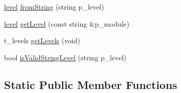 \begin{DoxyCompactItemize}
\item 
\hyperlink{classxtd_1_1logger_a250ce2f143da181d7149a1556da2a6f1}{level} \hyperlink{classxtd_1_1logger_a88420216bbafe0a36bbd25080ac14567}{from\+String} (string p\+\_\+level)
\item 
\hyperlink{classxtd_1_1logger_a250ce2f143da181d7149a1556da2a6f1}{level} \hyperlink{classxtd_1_1logger_a4cb9dd27ead213c0a9f3d85d80e9a7b4}{get\+Level} (const string \&p\+\_\+module)
\item 
t\+\_\+levels \hyperlink{classxtd_1_1logger_a8b22d69269de5f4269fbbf43fe6f9b53}{get\+Levels} (void)
\item 
bool \hyperlink{classxtd_1_1logger_aaca2ec5d979b7f57c2060ecaac2715ec}{is\+Valid\+String\+Level} (string p\+\_\+level)
\end{DoxyCompactItemize}
\subsection*{Static Public Member Functions}
